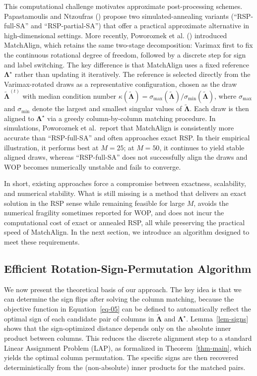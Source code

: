 \documentclass[
  man,
  longtable,
  nolmodern,
  notxfonts,
  notimes,
  colorlinks=true,linkcolor=blue,citecolor=blue,urlcolor=blue]{apa7}
\theoremstyle{plain}
\theoremstyle{plain}
\theoremstyle{remark}
\begin{document}
This computational challenge motivates approximate post-processing
schemes. Papastamoulis and Ntzoufras
() propose two
simulated-annealing variants (``RSP-full-SA'' and ``RSP-partial-SA'')
that offer a practical approximate alternative in high-dimensional
settings. More recently, Poworoznek et al.
() introduced MatchAlign, which
retains the same two-stage decomposition: Varimax first to fix the
continuous rotational degree of freedom, followed by a discrete step for
sign and label switching. The key difference is that MatchAlign uses a
fixed reference \(\mathbf{\Lambda}^\star\) rather than updating it
iteratively. The reference is selected directly from the Varimax-rotated
draws as a representative configuration, chosen as the draw
\(\mathbf{\tilde\Lambda}^{(t)}\) with median condition number
\(\kappa\left(\tilde{\mathbf\Lambda}\right)=\sigma_{\max}\left(\tilde{\mathbf\Lambda}\right) / \sigma_{\min}\left(\tilde{\mathbf\Lambda}\right)\),
where \(\sigma_{\max}\) and \(\sigma_{\min}\) denote the largest and
smallest singular values of \(\tilde{\mathbf\Lambda}\). Each draw is
then aligned to \(\mathbf{\Lambda}^\star\) via a greedy column-by-column
matching procedure. In simulations, Poworoznek et al.~report that
MatchAlign is consistently more accurate than ``RSP-full-SA'' and often
approaches exact RSP. In their empirical illustration, it performs best
at \(M=25\); at \(M=50\), it continues to yield stable aligned draws,
whereas ``RSP-full-SA'' does not successfully align the draws and WOP
becomes numerically unstable and fails to converge.

In short, existing approaches force a compromise between exactness,
scalability, and numerical stability. What is still missing is a method
that delivers an exact solution in the RSP sense while remaining
feasible for large \(M\), avoids the numerical fragility sometimes
reported for WOP, and does not incur the computational cost of exact or
annealed RSP, all while preserving the practical speed of MatchAlign. In
the next section, we introduce an algorithm designed to meet these
requirements.

\subsection{Efficient Rotation-Sign-Permutation
Algorithm}\label{efficient-rotation-sign-permutation-algorithm}

We now present the theoretical basis of our approach. The key idea is
that we can determine the sign flips after solving the column matching,
because the objective function in Equation~\ref{eq-05} can be defined to
automatically reflect the optimal sign of each candidate pair of columns
in \(\mathbf{\tilde\Lambda}\) and \(\mathbf{\Lambda}^\star\).
Lemma~\ref{lem-signs} shows that the sign-optimized distance depends
only on the absolute inner product between columns. This reduces the
discrete alignment step to a standard Linear Assignment Problem (LAP),
as formalized in Theorem~\ref{thm-main}, which yields the optimal column
permutation. The specific signs are then recovered deterministically
from the (non-absolute) inner products for the matched pairs.
\end{document}
